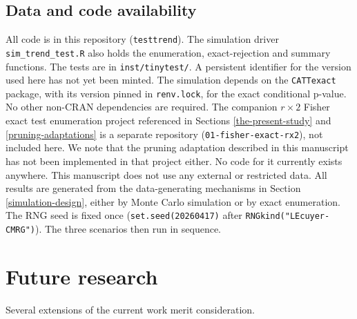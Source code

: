 \documentclass[
  11pt,
]{article}
\begin{document}
\subsection{Data and code availability}\label{data-and-code-availability}

All code is in this repository (\texttt{testtrend}). The
simulation driver \texttt{sim\_trend\_test.R} also holds the
enumeration, exact-rejection and summary functions. The
tests are in \texttt{inst/tinytest/}. A persistent identifier
for the version used here has not yet been minted.
The simulation depends
on the \texttt{CATTexact} package, with its version pinned in
\texttt{renv.lock}, for the exact conditional p-value. No other
non-CRAN dependencies are required. The companion
\(r \times 2\) Fisher exact test enumeration project
referenced in Sections \ref{the-present-study} and
\ref{pruning-adaptations} is a separate repository
(\texttt{01-fisher-exact-rx2}), not included here. We note that
the pruning adaptation described in this manuscript has
not been implemented in that project either. No code for
it currently exists anywhere. This manuscript does not
use any external or restricted data. All results are
generated from the data-generating mechanisms in Section
\ref{simulation-design}, either by Monte Carlo
simulation or by exact enumeration. The RNG seed is fixed
once (\texttt{set.seed(20260417)} after
\texttt{RNGkind("L\textquotesingle{}Ecuyer-CMRG")}). The three scenarios then run
in sequence.

\section{Future research}\label{future-research}

Several extensions of the current work merit
consideration.
\end{document}
